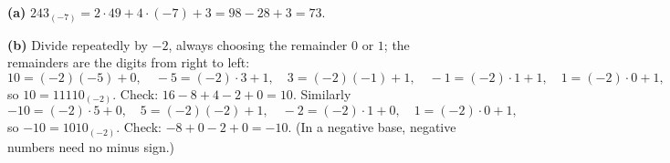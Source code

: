 \textbf{(a)} $243_{(-7)}=2\cdot49+4\cdot(-7)+3=98-28+3=\boxed{73}$.

\textbf{(b)} Divide repeatedly by $-2$, always choosing the remainder $0$ or $1$; the remainders are the digits from right to left:
\[10=(-2)(-5)+0,\quad-5=(-2)\cdot3+1,\quad3=(-2)(-1)+1,\quad-1=(-2)\cdot1+1,\quad1=(-2)\cdot0+1,\]
so $10=\boxed{11110_{(-2)}}$. Check: $16-8+4-2+0=10$. Similarly
\[-10=(-2)\cdot5+0,\quad5=(-2)(-2)+1,\quad-2=(-2)\cdot1+0,\quad1=(-2)\cdot0+1,\]
so $-10=\boxed{1010_{(-2)}}$. Check: $-8+0-2+0=-10$. (In a negative base, negative numbers need no minus sign.)
